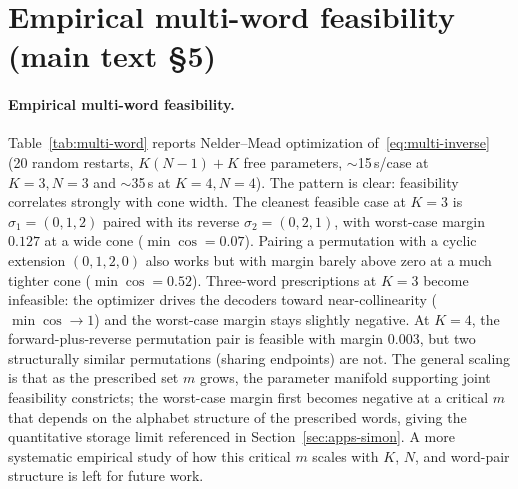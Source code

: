 \documentclass[12pt]{article}
\newcommand{\vv}[1]{\mathbf{#1}}
\newcommand{\DD}{\vv{D}}
\newcommand{\RR}{\mathbb{R}}
\begin{document}



\section{Empirical multi-word feasibility (main text \S 5)}\label{app:multi-word-feas}

\paragraph{Empirical multi-word feasibility.} Table~\ref{tab:multi-word} reports Nelder--Mead optimization of~\eqref{eq:multi-inverse} (20 random restarts, $K(N{-}1){+}K$ free parameters, $\sim$15\,s/case at $K{=}3,N{=}3$ and $\sim$35\,s at $K{=}4,N{=}4$). The pattern is clear: feasibility correlates strongly with cone width. The cleanest feasible case at $K{=}3$ is $\sigma_1{=}(0,1,2)$ paired with its reverse $\sigma_2{=}(0,2,1)$, with worst-case margin $0.127$ at a wide cone ($\min\cos = 0.07$). Pairing a permutation with a cyclic extension $(0,1,2,0)$ also works but with margin barely above zero at a much tighter cone ($\min\cos = 0.52$). Three-word prescriptions at $K{=}3$ become infeasible: the optimizer drives the decoders toward near-collinearity ($\min\cos \to 1$) and the worst-case margin stays slightly negative. At $K{=}4$, the forward-plus-reverse permutation pair is feasible with margin $0.003$, but two structurally similar permutations (sharing endpoints) are not. The general scaling is that as the prescribed set $m$ grows, the parameter manifold supporting joint feasibility constricts; the worst-case margin first becomes negative at a critical $m$ that depends on the alphabet structure of the prescribed words, giving the quantitative storage limit referenced in Section~\ref{sec:apps-simon}. A more systematic empirical study of how this critical $m$ scales with $K$, $N$, and word-pair structure is left for future work.
\end{document}
